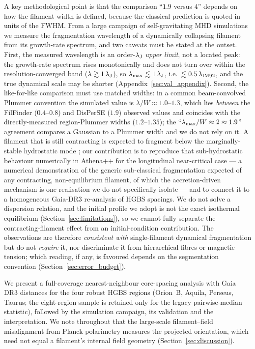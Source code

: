 \documentclass[usenatbib,twoside,twocolumn]{mnras}
\begin{document}
A key methodological point is that the comparison ``$1.9$ versus $4$'' depends on how the filament width is defined, because the classical prediction is quoted in units of the FWHM. From a large campaign of self-gravitating MHD simulations we measure the fragmentation wavelength of a dynamically collapsing filament from its growth-rate spectrum, and two caveats must be stated at the outset. First, the measured wavelength is an order-$\lambda_{\rm J}$ \emph{upper limit}, not a located peak: the growth-rate spectrum rises monotonically and does not turn over within the resolution-converged band ($\lambda\gtrsim1\,\lambda_{\rm J}$), so $\lambda_{\rm max}\lesssim1\,\lambda_{\rm J}$, i.e.\ $\lesssim0.5\,\lambda_{\rm IM92}$, and the true dynamical scale may be shorter (Appendix~\ref{sec:val_appendix}). Second, the like-for-like comparison must use matched widths: in a common beam-convolved Plummer convention the simulated value is $\lambda/W\approx1.0$--$1.3$, which lies \emph{between} the FilFinder ($0.4$--$0.8$) and DisPerSE ($1.9$) observed values and coincides with the directly-measured region-Plummer widths ($1.2$--$1.35$); the ``$\lambda_{\rm max}/W\approx2\approx1.9$'' agreement compares a Gaussian to a Plummer width and we do not rely on it. A filament that is still contracting is expected to fragment below the marginally-stable hydrostatic mode \citep{Clarke2016,Clarke2017}; our contribution is to reproduce that sub-hydrostatic behaviour numerically in Athena++ for the longitudinal near-critical case --- a numerical demonstration of the generic sub-classical fragmentation expected of any contracting, non-equilibrium filament, of which the accretion-driven \citet{Clarke2016,Clarke2017} mechanism is one realisation we do not specifically isolate --- and to connect it to a homogeneous Gaia-DR3 re-analysis of HGBS spacings. We do not solve a dispersion relation, and the initial profile we adopt is not the exact isothermal equilibrium (Section~\ref{sec:limitations}), so we cannot fully separate the contracting-filament effect from an initial-condition contribution. The observations are therefore \emph{consistent with} single-filament dynamical fragmentation but do not \emph{require} it, nor discriminate it from hierarchical fibres or magnetic tension; which reading, if any, is favoured depends on the segmentation convention (Section~\ref{sec:error_budget}).

We present a full-coverage nearest-neighbour core-spacing analysis with Gaia DR3 distances \citep{Zhang2023} for the four robust HGBS regions (Orion~B, Aquila, Perseus, Taurus; the eight-region sample is retained only for the legacy pairwise-median statistic), followed by the simulation campaign, its validation and the interpretation. We note throughout that the large-scale filament--field misalignment from Planck polarimetry \citep{Planck2016} measures the projected orientation, which need not equal a filament's internal field geometry (Section~\ref{sec:discussion}).
\end{document}
